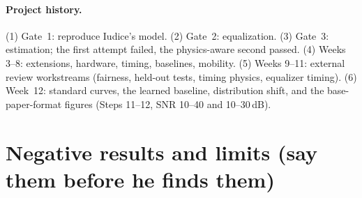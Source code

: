 \documentclass[11pt,a4paper]{article}
\begin{document}
\paragraph{Project history.}
(1) Gate~1: reproduce Iudice's model. (2) Gate~2: equalization. (3) Gate~3: estimation; the first attempt failed, the
physics-aware second passed. (4) Weeks 3--8: extensions, hardware, timing, baselines, mobility. (5) Weeks 9--11: external
review workstreams (fairness, held-out tests, timing physics, equalizer timing). (6) Week~12: standard curves, the learned
baseline, distribution shift, and the base-paper-format figures (Steps 11--12, SNR 10--40 and 10--30\,dB).

\section{Negative results and limits (say them before he finds them)}
\end{document}
